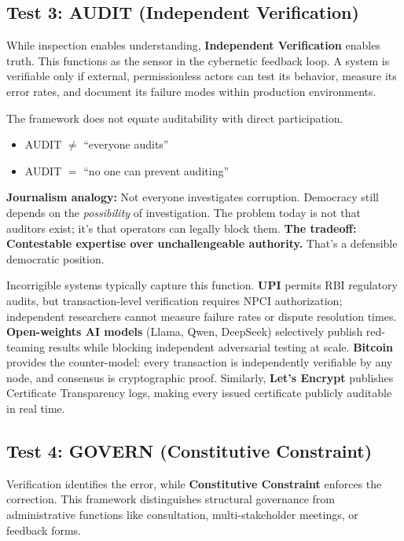 \subsection{Test 3: AUDIT (Independent Verification)}

While inspection enables understanding, \textbf{Independent Verification} enables truth. This functions as the sensor in the cybernetic feedback loop. A system is verifiable only if external, permissionless actors can test its behavior, measure its error rates, and document its failure modes within production environments.

\begin{clarification}
The framework does not equate auditability with direct participation.
\begin{itemize}[noitemsep]
    \item AUDIT $\neq$ ``everyone audits''
    \item AUDIT $=$ ``no one can prevent auditing''
\end{itemize}
\textbf{Journalism analogy:} Not everyone investigates corruption. Democracy still depends on the \textit{possibility} of investigation. The problem today is not that auditors exist; it's that operators can legally block them. \textbf{The tradeoff: Contestable expertise over unchallengeable authority.} That's a defensible democratic position.
\end{clarification}

Incorrigible systems typically capture this function. \textbf{UPI} permits RBI regulatory audits, but transaction-level verification requires NPCI authorization; independent researchers cannot measure failure rates or dispute resolution times. \textbf{Open-weights AI models} (Llama, Qwen, DeepSeek) selectively publish red-teaming results while blocking independent adversarial testing at scale. \textbf{Bitcoin} provides the counter-model: every transaction is independently verifiable by any node, and consensus is cryptographic proof. Similarly, \textbf{Let's Encrypt} publishes Certificate Transparency logs, making every issued certificate publicly auditable in real time.

\subsection{Test 4: GOVERN (Constitutive Constraint)}

Verification identifies the error, while \textbf{Constitutive Constraint} enforces the correction. This framework distinguishes structural governance from administrative functions like consultation, multi-stakeholder meetings, or feedback forms.


